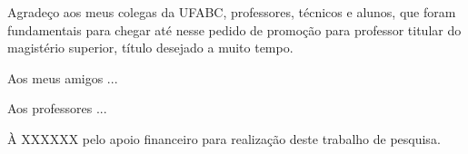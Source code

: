\begin{agradecimentos}


Agradeço aos meus colegas da UFABC, professores, técnicos e alunos, que foram fundamentais para chegar até nesse pedido de promoção para professor titular do magistério superior, título desejado a muito tempo.

Aos meus amigos ...

Aos professores ...

À XXXXXX pelo apoio financeiro para realização deste trabalho de pesquisa.

\end{agradecimentos}
